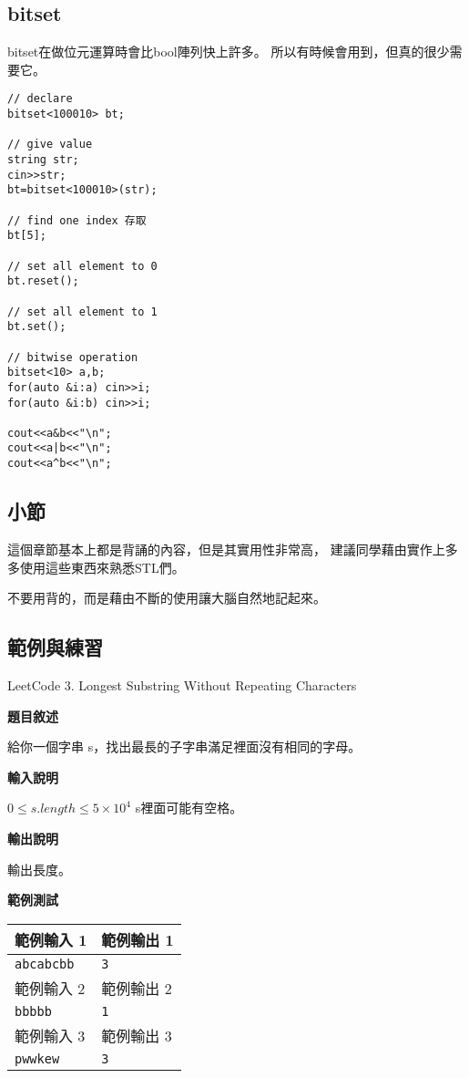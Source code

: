     \subsection{bitset}
    bitset在做位元運算時會比bool陣列快上許多。
    所以有時候會用到，但真的很少需要它。

\begin{lstlisting}[caption=bitset 用法]
// declare
bitset<100010> bt;

// give value
string str;
cin>>str;
bt=bitset<100010>(str);

// find one index 存取
bt[5];

// set all element to 0
bt.reset();

// set all element to 1
bt.set();

// bitwise operation
bitset<10> a,b;
for(auto &i:a) cin>>i;
for(auto &i:b) cin>>i;

cout<<a&b<<"\n";
cout<<a|b<<"\n";
cout<<a^b<<"\n";
\end{lstlisting}

    \subsection{小節}
    這個章節基本上都是背誦的內容，但是其實用性非常高，
    建議同學藉由實作上多多使用這些東西來熟悉STL們。

    \begin{tip}
        不要用背的，而是藉由不斷的使用讓大腦自然地記起來。
    \end{tip}

    \subsection{範例與練習}

    \problem LeetCode 3. Longest Substring Without Repeating Characters

    \textbf{題目敘述}

    給你一個字串 s，找出最長的子字串滿足裡面沒有相同的字母。

    \textbf{輸入說明}

    $0 \le s.length \le 5 \times 10^4$
    s裡面可能有空格。
    
    \textbf{輸出說明}

    輸出長度。

    \textbf{範例測試}

    \begin{tabular}{|m{7cm}|m{7cm}|}
        \hline
        範例輸入 1 & 範例輸出 1 \\
        \hline
        \verb|abcabcbb| & \verb|3| \\
        \hline
        範例輸入 2 & 範例輸出 2 \\
        \hline
        \verb|bbbbb| & \verb|1| \\
        \hline
        範例輸入 3 & 範例輸出 3 \\
        \hline
        \verb|pwwkew| & \verb|3|\\
        \hline
    \end{tabular}